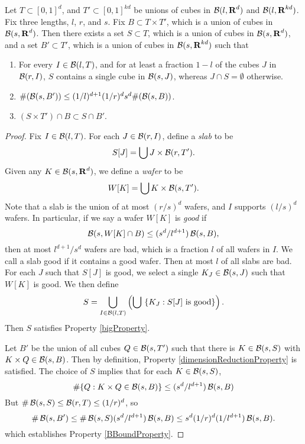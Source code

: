 \begin{lemma}
    Let $T \subset [0,1]^d$, and $T' \subset [0,1]^{kd}$ be unions of cubes in $\operatorname{\mathcal{B}}(l,\operatorname{\mathbf{R}}^d)$ and $\operatorname{\mathcal{B}}(l,\operatorname{\mathbf{R}}^{kd})$. Fix three lengths, $l$, $r$, and $s$. Fix $B \subset T \times T'$, which is a union of cubes in $\operatorname{\mathcal{B}}(s,\operatorname{\mathbf{R}}^d)$. Then there exists a set $S \subset T$, which is a union of cubes in $\operatorname{\mathcal{B}}(s,\operatorname{\mathbf{R}}^d)$, and a set $B' \subset T'$, which is a union of cubes in $\operatorname{\mathcal{B}}(s,\operatorname{\mathbf{R}}^{kd})$ such that
    \begin{enumerate}
        \item \label{bigProperty} For every $I \in \operatorname{\mathcal{B}}(l,T)$, and for at least a fraction $1 - l$ of the cubes $J$ in $\operatorname{\mathcal{B}}(r,I)$, $S$ contains a single cube in $\operatorname{\mathcal{B}}(s,J)$, whereas $J \cap S = \emptyset$ otherwise.

        \item \label{BBoundProperty} $\#(\operatorname{\mathcal{B}}(s,B')) \leq (1/l)^{d+1} (1/r)^d s^d \#(\operatorname{\mathcal{B}}(s,B))$.

        \item \label{dimensionReductionProperty} $(S \times T') \cap B \subset S \cap B'$.
    \end{enumerate}
\end{lemma}
\begin{proof}
    Fix $I \in \operatorname{\mathcal{B}}(l,T)$. For each $J \in \operatorname{\mathcal{B}}(r,I)$, define a \emph{slab} to be
    \[ S[J] = \bigcup J \times \operatorname{\mathcal{B}}(r,T'). \]
    Given any $K \in \operatorname{\mathcal{B}}(s,\operatorname{\mathbf{R}}^d)$, we define a \emph{wafer} to be
    \[ W[K] = \bigcup K \times \operatorname{\mathcal{B}}(s,T'). \]
    Note that a slab is the union of at most $(r/s)^d$ wafers, and $I$ supports $(l/s)^d$ wafers. In particular, if we say a wafer $W[K]$ is \emph{good} if
    \[ \operatorname{\mathcal{B}}(s,W[K] \cap B) \leq (s^d/l^{d+1}) \operatorname{\mathcal{B}}(s,B), \]
    then at most $l^{d+1}/s^d$ wafers are bad, which is a fraction $l$ of all wafers in $I$. We call a slab good if it contains a good wafer. Then at most $l$ of all slabs are bad. For each $J$ such that $S[J]$ is good, we select a single $K_J \in \operatorname{\mathcal{B}}(s,J)$ such that $W[K]$ is good. We then define
    \[ S = \bigcup_{I \in \operatorname{\mathcal{B}}(l,T)} \left( \bigcup\ \{ K_J : S[J]\ \text{is good} \} \right). \]
    Then $S$ satisfies Property \ref{bigProperty}.

    Let $B'$ be the union of all cubes $Q \in \operatorname{\mathcal{B}}(s,T')$ such that there is $K \in \operatorname{\mathcal{B}}(s,S)$ with $K \times Q \in \operatorname{\mathcal{B}}(s,B)$. Then by definition, Property \ref{dimensionReductionProperty} is satisfied. The choice of $S$ implies that for each $K \in \operatorname{\mathcal{B}}(s,S)$,
    \[ \# \{ Q : K \times Q \in \operatorname{\mathcal{B}}(s,B) \} \leq (s^d/l^{d+1}) \operatorname{\mathcal{B}}(s,B) \]
    But $\# \operatorname{\mathcal{B}}(s,S) \leq \operatorname{\mathcal{B}}(r,T) \leq (1/r)^d$, so
    \[ \# \operatorname{\mathcal{B}}(s,B') \leq \# \operatorname{\mathcal{B}}(s,S) (s^d/l^{d+1}) \operatorname{\mathcal{B}}(s,B) \leq s^d (1/r)^d (1/l^{d+1}) \operatorname{\mathcal{B}}(s,B). \]
    which establishes Property \ref{BBoundProperty}.
\end{proof}

